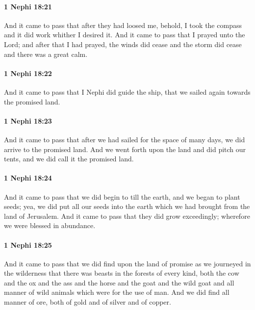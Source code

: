 		\paragraph{1 Nephi 18:21} %
			\label{1NEPHI-18-21}

			And it came to pass that after they had loosed me,
			behold, I took the compass and it did work whither I desired it.
			And it came to pass that I prayed unto the Lord;
			and after that I had prayed,
			the winds did cease and the storm did cease and there was a great calm.

		\paragraph{1 Nephi 18:22} %
			\label{1NEPHI-18-22}

			And it came to pass that I Nephi did guide the ship,
			that we sailed again towards the promised land.

		\paragraph{1 Nephi 18:23} %
			\label{1NEPHI-18-23}

			And it came to pass that after we had sailed for the space of many days,
			we did arrive to the promised land.
			And we went forth upon the land and did pitch our tents,
			and we did call it the promised land.

		\paragraph{1 Nephi 18:24} %
			\label{1NEPHI-18-24}

			And it came to pass that we did begin to till the earth,
			and we began to plant seeds;
			yea, we did put all our seeds into the earth
			which we had brought from the land of Jerusalem.
			And it came to pass that they did grow exceedingly;
			wherefore we were blessed in abundance.

		\paragraph{1 Nephi 18:25} %
			\label{1NEPHI-18-25}

			And it came to pass that we did find upon the land of promise
			as we journeyed in the wilderness
			that there was beasts in the forests of every kind,
			both the cow and the ox and the ass and the horse and the goat and the wild goat
			and all manner of wild animals which were for the use of man.
			And we did find all manner of ore, both of gold and of silver and of copper.

